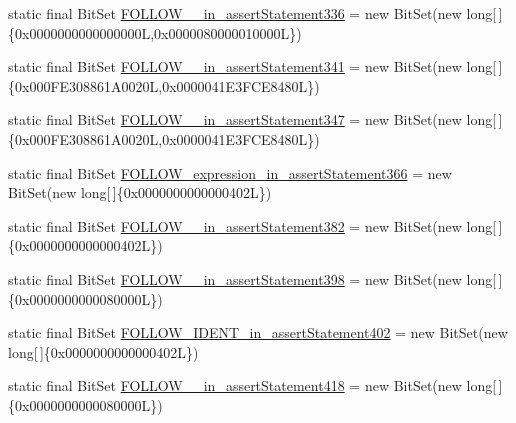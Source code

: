 \begin{DoxyCompactItemize}
static final Bit\-Set \hyperlink{classorg_1_1tzi_1_1use_1_1parser_1_1testsuite_1_1_test_suite_parser_a52c85712033518a645f5b7680c1bdaea}{F\-O\-L\-L\-O\-W\-\_\-\_\-in\-\_\-assert\-Statement336} = new Bit\-Set(new long\mbox{[}$\,$\mbox{]}\{0x0000000000000000\-L,0x0000080000010000\-L\})
\item 
static final Bit\-Set \hyperlink{classorg_1_1tzi_1_1use_1_1parser_1_1testsuite_1_1_test_suite_parser_a8924cfc51665f337ae1ea3c6f711716c}{F\-O\-L\-L\-O\-W\-\_\-\_\-in\-\_\-assert\-Statement341} = new Bit\-Set(new long\mbox{[}$\,$\mbox{]}\{0x000\-F\-E308861\-A0020\-L,0x0000041\-E3\-F\-C\-E8480\-L\})
\item 
static final Bit\-Set \hyperlink{classorg_1_1tzi_1_1use_1_1parser_1_1testsuite_1_1_test_suite_parser_aefe093ba4e2378b15e855341cbdc7462}{F\-O\-L\-L\-O\-W\-\_\-\_\-in\-\_\-assert\-Statement347} = new Bit\-Set(new long\mbox{[}$\,$\mbox{]}\{0x000\-F\-E308861\-A0020\-L,0x0000041\-E3\-F\-C\-E8480\-L\})
\item 
static final Bit\-Set \hyperlink{classorg_1_1tzi_1_1use_1_1parser_1_1testsuite_1_1_test_suite_parser_afdc6ab31c75f166671f3bb76022dedcb}{F\-O\-L\-L\-O\-W\-\_\-expression\-\_\-in\-\_\-assert\-Statement366} = new Bit\-Set(new long\mbox{[}$\,$\mbox{]}\{0x0000000000000402\-L\})
\item 
static final Bit\-Set \hyperlink{classorg_1_1tzi_1_1use_1_1parser_1_1testsuite_1_1_test_suite_parser_ab98c4dc06734c530da7ac5caac5ae10c}{F\-O\-L\-L\-O\-W\-\_\-\_\-in\-\_\-assert\-Statement382} = new Bit\-Set(new long\mbox{[}$\,$\mbox{]}\{0x0000000000000402\-L\})
\item 
static final Bit\-Set \hyperlink{classorg_1_1tzi_1_1use_1_1parser_1_1testsuite_1_1_test_suite_parser_a7ee33c4a03a0091e9dd87141be0afb92}{F\-O\-L\-L\-O\-W\-\_\-\_\-in\-\_\-assert\-Statement398} = new Bit\-Set(new long\mbox{[}$\,$\mbox{]}\{0x0000000000080000\-L\})
\item 
static final Bit\-Set \hyperlink{classorg_1_1tzi_1_1use_1_1parser_1_1testsuite_1_1_test_suite_parser_a635aafb1d161a40833b9b41aae17855d}{F\-O\-L\-L\-O\-W\-\_\-\-I\-D\-E\-N\-T\-\_\-in\-\_\-assert\-Statement402} = new Bit\-Set(new long\mbox{[}$\,$\mbox{]}\{0x0000000000000402\-L\})
\item 
static final Bit\-Set \hyperlink{classorg_1_1tzi_1_1use_1_1parser_1_1testsuite_1_1_test_suite_parser_a0374121280f0612a81d8cd3901f60390}{F\-O\-L\-L\-O\-W\-\_\-\_\-in\-\_\-assert\-Statement418} = new Bit\-Set(new long\mbox{[}$\,$\mbox{]}\{0x0000000000080000\-L\})
\item 

\end{DoxyCompactItemize}
